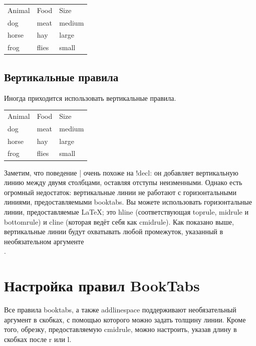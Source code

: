 \documentclass{article}
\begin{document}
  \smallskip

  \setlength\tabcolsep{1cm}
  \begin{tabular}{lll}
    Animal & Food & Size \\
    dog & meat & medium \\
    horse & hay & large \\
    frog & flies & small \\
  \end{tabular}

  \smallskip




  \subsection{Вертикальные правила}
  \label{subsec:width}
  
  Иногда приходится использовать вертикальные правила.


  \smallskip

  \begin{tabular}{l|ll}
    Animal & Food & Size \\[2pt]
    dog & meat & medium \\
    horse & hay & large \\
    frog & flies & small \\
  \end{tabular}

  \smallskip

  Заметим, что поведение | очень похоже на !{decl}: он добавляет
  вертикальную линию между двумя столбцами, оставляя отступы неизменными. Однако есть огромный
  недостаток: вертикальные линии не работают с горизонтальными линиями, предоставляемыми booktabs. Вы можете использовать горизонтальные линии, предоставляемые LaTeX; это
  hline (соответствующая toprule, midrule и bottomrule) и cline
  (которая ведёт себя как cmidrule). Как показано выше, вертикальные линии будут охватывать любой
  промежуток, указанный в необязательном аргументе \\.



  \section{Настройка правил BookTabs}
  \label{sec:booktabsrules}
  
  Все правила booktabs, а также addlinespace поддерживают необязательный аргумент в скобках, с помощью которого можно задать толщину линии. Кроме того, обрезку,
  предоставляемую cmidrule, можно настроить, указав длину в скобках после r
  или l.
\end{document}
